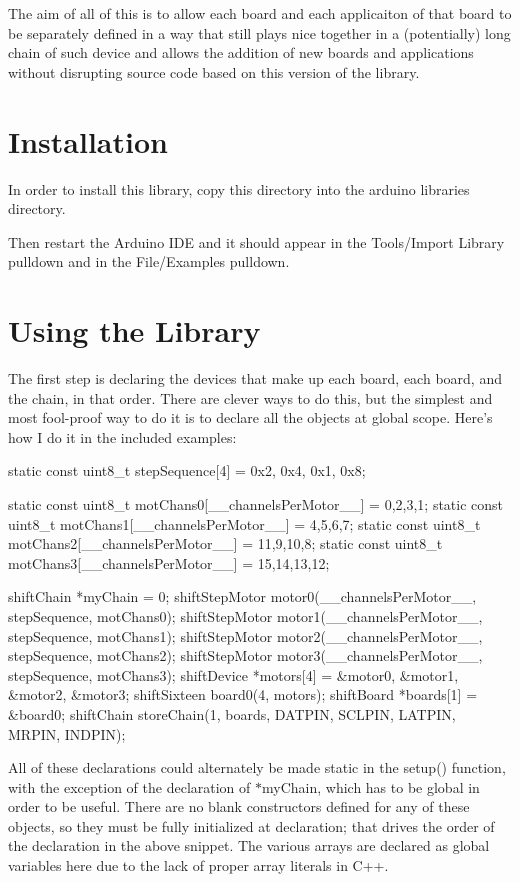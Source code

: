 The aim of all of this is to allow each board and each applicaiton of that board to be separately defined in a way that still plays nice together in a (potentially) long chain of such device and allows the addition of new boards and applications without disrupting source code based on this version of the library.\hypertarget{main_install}{}\section{Installation}\label{main_install}
In order to install this library, copy this directory into the arduino libraries directory.

Then restart the Arduino IDE and it should appear in the Tools/Import Library pulldown and in the File/Examples pulldown.\hypertarget{main_using}{}\section{Using the Library}\label{main_using}
The first step is declaring the devices that make up each board, each board, and the chain, in that order. There are clever ways to do this, but the simplest and most fool-\/proof way to do it is to declare all the objects at global scope. Here's how I do it in the included examples:


\begin{DoxyCode}
  static const uint8_t stepSequence[4] = {0x2, 0x4, 0x1, 0x8}; 

  static const uint8_t motChans0[__channelsPerMotor__] = {0,2,3,1}; 
  static const uint8_t motChans1[__channelsPerMotor__] = {4,5,6,7}; 
  static const uint8_t motChans2[__channelsPerMotor__] = {11,9,10,8}; 
  static const uint8_t motChans3[__channelsPerMotor__] = {15,14,13,12}; 

  shiftChain *myChain = 0; 
  shiftStepMotor motor0(__channelsPerMotor__, stepSequence, motChans0); 
  shiftStepMotor motor1(__channelsPerMotor__, stepSequence, motChans1); 
  shiftStepMotor motor2(__channelsPerMotor__, stepSequence, motChans2); 
  shiftStepMotor motor3(__channelsPerMotor__, stepSequence, motChans3); 
  shiftDevice *motors[4] = {&motor0, &motor1, &motor2, &motor3}; 
  shiftSixteen board0(4, motors); shiftBoard *boards[1] = {&board0}; 
  shiftChain storeChain(1, boards, DATPIN, SCLPIN, LATPIN, MRPIN, INDPIN);
\end{DoxyCode}


All of these declarations could alternately be made static in the setup() function, with the exception of the declaration of $\ast$myChain, which has to be global in order to be useful. There are no blank constructors defined for any of these objects, so they must be fully initialized at declaration; that drives the order of the declaration in the above snippet. The various arrays are declared as global variables here due to the lack of proper array literals in C++.

